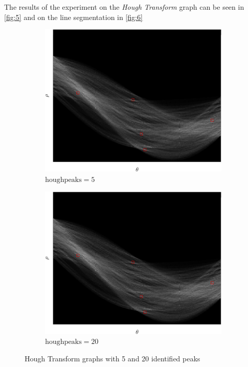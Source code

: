 \documentclass[lettersize,journal]{IEEEtran}
\begin{document}
\hfill

\noindent The results of the experiment on the \emph{Hough Transform} graph can be seen in \autoref{fig:5} and on the line segmentation in \autoref{fig:6}

\begin{figure}[h]
    \centering 
     
    \begin{subfigure}[h]{0.23\textwidth}
        \centering 
        \includegraphics[width=\linewidth]{hough_transform_5}
        \caption{$\text{houghpeaks} = 5$}  
    \end{subfigure}
    \begin{subfigure}[h]{0.23\textwidth}
        \centering
        \includegraphics[width=\linewidth]{hough_transform_5}
        \caption{$\text{houghpeaks} = 20$}  
    \end{subfigure}
    \caption{Hough Transform graphs with 5 and 20 identified peaks}
    \label{fig:5}
\end{figure}
\end{document}
